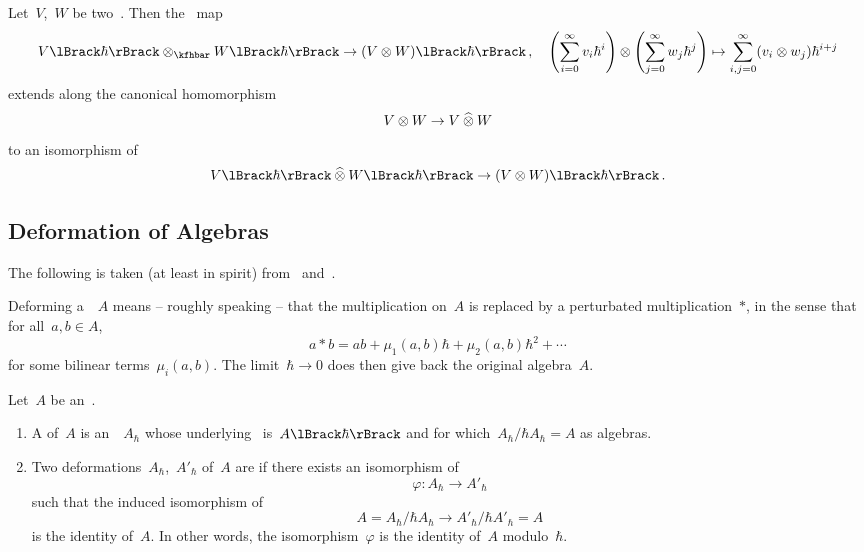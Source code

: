 \documentclass[a4paper, 11pt, oneside]{scrartcl}
\begin{document}
\begin{proposition}
  Let~$V$,~$W$ be two~\vectorspaces{$\kf$}.
  Then the~\linear{$\kfhbar$} map
  \[
    \power{V}{\hbar} \tensor_{\kfhbar} \power{W}{\hbar}
    \to
    \power{(V \tensor W)}{\hbar} \,,
    \quad
    \Biggl( \sum_{i=0}^\infty v_i \hbar^i \Biggr)
    \tensor
    \Biggl( \sum_{j=0}^\infty w_j \hbar^j \Biggr)
    \mapsto
    \sum_{i,j=0}^\infty (v_i \tensor w_j) \hbar^{i+j}
  \]
  extends along the canonical homomorphism
  \[
    V \otimes W \to V \mathbin{\widehat{\otimes}} W
  \]
  to an isomorphism of~\modules{$\kfhbar$}
  \[
    \power{V}{\hbar} \ctensor \power{W}{\hbar}
    \to
    \power{(V \tensor W)}{\hbar} \,.
  \]
\end{proposition}



\subsection{Deformation of Algebras}

The following is taken (at least in spirit) from~\cite[\S 5.2]{pieter_hochschild} and~\cite{gerstenhaber_quantum}.

\begin{motivation}
  Deforming a~\algebra{$\kf$}~$A$ means -- roughly speaking -- that the multiplication on~$A$ is replaced by a perturbated multiplication~$*$, in the sense that for all~$a, b \in A$,
  \[
    a * b
    =
    ab + \mu_1(a,b) \hbar + \mu_2(a,b) \hbar^2 + \dotsb
  \]
  for some bilinear terms~$\mu_i(a,b)$.
  The limit~$\hbar \to 0$ does then give back the original algebra~$A$.
\end{motivation}

\begin{definition}
  \label{definition of algebra deformations}
  Let~$A$ be an~\algebra{$\kf$}.
  \begin{enumerate}
    \item
      A  of~$A$ is an~\algebra{$\kfhbar$}~$A_\hbar$ whose underlying~\module{$\kfhbar$} is~$\power{A}{\hbar}$ and for which~$A_\hbar / \hbar A_\hbar = A$ as algebras.
    \item
      Two deformations~$A_\hbar$,~$A'_\hbar$ of~$A$ are  if there exists an isomorphism of~\algebras{$\kfhbar$}
      \[
        \varphi
        \colon
        A_\hbar
        \to
        A'_\hbar
      \]
      such that the induced isomorphism of~\algebras{$\kf$}
      \[
        A
        =
        A_\hbar / \hbar A_\hbar
        \to
        A'_\hbar / \hbar A'_\hbar
        = A
      \]
      is the identity of~$A$.
      In other words, the isomorphism~$\varphi$ is the identity of~$A$ modulo~$\hbar$.
  \end{enumerate}
\end{definition}
\end{document}
